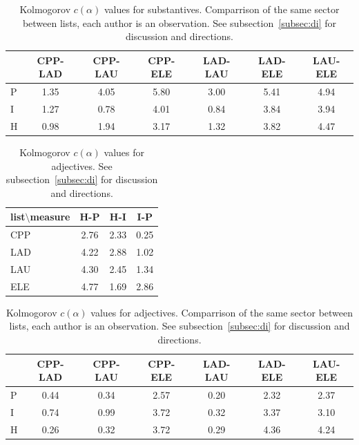 \documentclass[%
 aip,
 jmp,%
 amsmath,amssymb,
 reprint,%
]{revtex4-1}
\begin{document}
\begin{table}
  \centering
    \small
\setlength{\tabcolsep}{.06667em}
  \begin{tabular}{|l|| c|c|c|c|c|c|}\hline
& CPP-LAD & CPP-LAU & CPP-ELE & LAD-LAU & LAD-ELE & LAU-ELE \\\hline
P & 1.35 & 4.05 & 5.80 & 3.00 & 5.41 & 4.94 \\\hline
I & 1.27 & 0.78 & 4.01 & 0.84 & 3.84 & 3.94 \\\hline
H & 0.98 & 1.94 & 3.17 & 1.32 & 3.82 & 4.47 \\\hline
  \end{tabular}
  \caption{Kolmogorov $c(\alpha)$ values for substantives. Comparrison of the same sector between lists, each author is an observation. See subsection~\ref{subsec:di} for discussion and directions.}
  \label{tab:kolSubInter}
\end{table}



\begin{table}
  \centering
    \small
\setlength{\tabcolsep}{.26667em}
  \begin{tabular}{|l|| c|c|c|}\hline
list$\setminus$measure & H-P & H-I & I-P \\\hline
CPP & 2.76 & 2.33 & 0.25 \\\hline
LAD & 4.22 & 2.88 & 1.02 \\\hline
LAU & 4.30 & 2.45 & 1.34 \\\hline
ELE & 4.77 & 1.69 & 2.86 \\\hline
  \end{tabular}
  \caption{Kolmogorov $c(\alpha)$ values for adjectives. See subsection~\ref{subsec:di} for discussion and directions.}
  \label{tab:kolAdj}
\end{table}

\begin{table}
  \centering
    \small
\setlength{\tabcolsep}{.06667em}
  \begin{tabular}{|l|| c|c|c|c|c|c|}\hline
 & CPP-LAD & CPP-LAU & CPP-ELE & LAD-LAU & LAD-ELE & LAU-ELE \\\hline
P & 0.44 & 0.34 & 2.57 & 0.20 & 2.32 & 2.37 \\\hline
I & 0.74 & 0.99 & 3.72 & 0.32 & 3.37 & 3.10 \\\hline
H & 0.26 & 0.32 & 3.72 & 0.29 & 4.36 & 4.24 \\\hline
  \end{tabular}
  \caption{Kolmogorov $c(\alpha)$ values for adjectives. Comparrison of the same sector between lists, each author is an observation. See subsection~\ref{subsec:di} for discussion and directions.}
  \label{tab:kolAdjInter}
\end{table}
\end{document}
